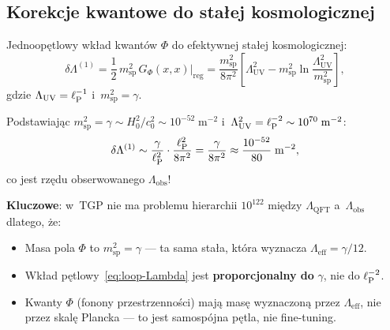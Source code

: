 \subsection{Korekcje kwantowe do stałej kosmologicznej}%
\label{app:E-cosmconst}

\begin{proposition}%
\label{prop:loop-Lambda}
Jednoopętlowy wkład kwantów $\Phi$ do efektywnej stałej
kosmologicznej:
\begin{equation}\label{eq:loop-Lambda}
    \delta\Lambda^{(1)}
    = \frac{1}{2}\,m_{\mathrm{sp}}^2\,
      G_\Phi(x,x)\big|_{\mathrm{reg}}
    = \frac{m_{\mathrm{sp}}^2}{8\pi^2}
      \left[\Lambda_{\mathrm{UV}}^2 - m_{\mathrm{sp}}^2
      \ln\frac{\Lambda_{\mathrm{UV}}^2}{m_{\mathrm{sp}}^2}\right],
\end{equation}
gdzie $\Lambda_{\mathrm{UV}} = \ell_{\mathrm{P}}^{-1}$ i~$m_{\mathrm{sp}}^2 = \gamma$.
\end{proposition}

\begin{remark}%
\label{rem:naturalness}
Podstawiając $m_{\mathrm{sp}}^2 = \gamma \sim H_0^2/c_0^2
\sim 10^{-52}\;\mathrm{m}^{-2}$
i~$\Lambda_{\mathrm{UV}}^2 = \ell_{\mathrm{P}}^{-2} \sim 10^{70}\;\mathrm{m}^{-2}$:
\begin{equation}
    \delta\Lambda^{(1)}
    \sim \frac{\gamma}{\ell_{\mathrm{P}}^2} \cdot \frac{\ell_{\mathrm{P}}^2}{8\pi^2}
    = \frac{\gamma}{8\pi^2}
    \approx \frac{10^{-52}}{80} \;\mathrm{m}^{-2},
\end{equation}
co jest rzędu obserwowanego $\Lambda_{\mathrm{obs}}$!

\textbf{Kluczowe}: w~TGP nie ma problemu hierarchii
$10^{122}$ między $\Lambda_{\mathrm{QFT}}$ a~$\Lambda_{\mathrm{obs}}$
dlatego, że:
\begin{itemize}[nosep]
    \item Masa pola $\Phi$ to $m_{\mathrm{sp}}^2 = \gamma$ ---
          ta sama stała, która wyznacza $\Lambda_{\mathrm{eff}} = \gamma/12$.
    \item Wkład pętlowy~\eqref{eq:loop-Lambda} jest
          \textbf{proporcjonalny do} $\gamma$, nie do $\ell_{\mathrm{P}}^{-2}$.
    \item Kwanty $\Phi$ (fonony przestrzenności) mają masę
          wyznaczoną przez $\Lambda_{\mathrm{eff}}$, nie przez skalę
          Plancka --- to jest samospójna pętla, nie fine-tuning.
\end{itemize}
\end{remark}

